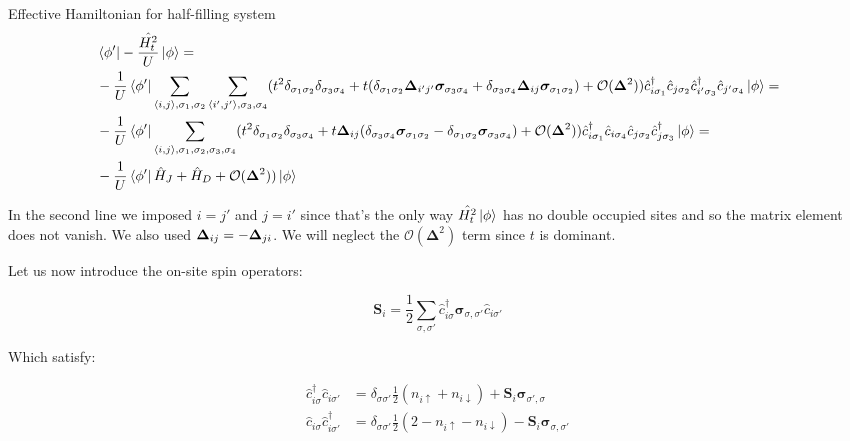 \begin{section}{Effective Hamiltonian for half-filling system}
\begin{align*}
&\bra{\phi'} -\frac{\hat{H_t^2}}{U} \ket{\phi} = \\
&-\frac{1}{U} \bra{\phi'} \sum_{\langle i,j \rangle, \sigma_1, \sigma_2} \sum_{\langle i',j' \rangle, 					\sigma_3, \sigma_4} (t^2 \delta_{\sigma_1 \sigma_2}\delta_{\sigma_3 \sigma_4} + t(\delta_{\sigma_1 \sigma_2}		\boldsymbol{\Delta}_{i'j'}\boldsymbol{\sigma}_{\sigma_3 \sigma_4} + \delta_{\sigma_3 \sigma_4}						\boldsymbol{\Delta}_{ij}\boldsymbol{\sigma}_{\sigma_1 \sigma_2}) + \mathcal{O}(\boldsymbol{\Delta}^2)) 				\hat{c}_{i\sigma_1}^\dagger \hat{c}_{j \sigma_2} \hat{c}_{i' \sigma_3}^\dagger \hat{c}_{j'\sigma_4}					\ket{\phi} = \\
&-\frac{1}{U} \bra{\phi'} \sum_{\langle i,j \rangle, \sigma_1, \sigma_2, \sigma_3, \sigma_4} (t^2 						\delta_{\sigma_1 \sigma_2}\delta_{\sigma_3 \sigma_4} + t\boldsymbol{\Delta}_{ij}(\delta_{\sigma_3 \sigma_4}			\boldsymbol{\sigma}_{\sigma_1 \sigma_2} - \delta_{\sigma_1 \sigma_2} \boldsymbol{\sigma}_{\sigma_3 					\sigma_4}) + \mathcal{O}(\boldsymbol{\Delta}^2)) \hat{c}_{i\sigma_1}^\dagger \hat{c}_{i\sigma_4} \hat{c}_{j 		\sigma_2} \hat{c}_{j \sigma_3}^\dagger \ket{\phi} = \\
&-\frac{1}{U} \bra{\phi'} \hat{H}_J + \hat{H}_D + \mathcal{O}(\boldsymbol{\Delta}^2))\ket{\phi}
\end{align*}

In the second line we imposed $i=j'$ and $j=i'$ since that's the only way $\hat{H_t^2}\ket{\phi}$ has no double occupied sites and so the matrix element does not vanish. We also used $\boldsymbol{\Delta}_{ij} = - \boldsymbol{\Delta}_{ji}$. We will neglect the $\mathcal{O}(\boldsymbol{\Delta}^2)$ term since $t$ is dominant.

Let us now introduce the on-site spin operators:

\begin{equation}
\boldsymbol{S}_i = \frac{1}{2} \sum_{\sigma, \sigma'} \hat{c}_{i \sigma}^\dagger \boldsymbol{\sigma}_{\sigma, \sigma'} \hat{c}_{i \sigma'}
\end{equation}

Which satisfy:

\begin{align*}
\hat{c}_{i \sigma}^\dagger \hat{c}_{i \sigma'} &= \delta_{\sigma \sigma'} \frac{1}{2} (n_{i \uparrow} + n_{i \downarrow}) + \boldsymbol{S}_i\boldsymbol{\sigma}_{\sigma', \sigma} \\ 
\hat{c}_{i \sigma} \hat{c}_{i \sigma'}^\dagger &= \delta_{\sigma \sigma'} \frac{1}{2} (2 - n_{i \uparrow} - n_{i \downarrow}) - \boldsymbol{S}_i\boldsymbol{\sigma}_{\sigma, \sigma'} 
\end{align*}


\end{section}
